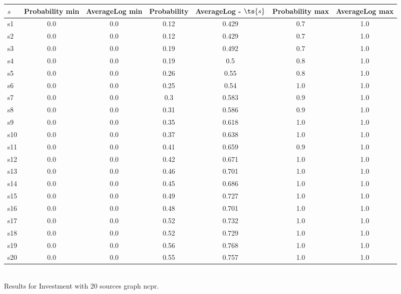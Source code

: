 \documentclass{article}
\begin{document}
\noindent\begin{tabular}{|l|c|c|c|c|c|c|}
\hline
$s$& Probability min & AverageLog min & Probability & AverageLog - $\ts{s}$ & Probability max & AverageLog max\\
\hline
s1 &0.0 & 0.0 & 0.12 & 0.429 & 0.7 & 1.0\\
\hline
s2 &0.0 & 0.0 & 0.12 & 0.429 & 0.7 & 1.0\\
\hline
s3 &0.0 & 0.0 & 0.19 & 0.492 & 0.7 & 1.0\\
\hline
s4 &0.0 & 0.0 & 0.19 & 0.5 & 0.8 & 1.0\\
\hline
s5 &0.0 & 0.0 & 0.26 & 0.55 & 0.8 & 1.0\\
\hline
s6 &0.0 & 0.0 & 0.25 & 0.54 & 1.0 & 1.0\\
\hline
s7 &0.0 & 0.0 & 0.3 & 0.583 & 0.9 & 1.0\\
\hline
s8 &0.0 & 0.0 & 0.31 & 0.586 & 0.9 & 1.0\\
\hline
s9 &0.0 & 0.0 & 0.35 & 0.618 & 1.0 & 1.0\\
\hline
s10 &0.0 & 0.0 & 0.37 & 0.638 & 1.0 & 1.0\\
\hline
s11 &0.0 & 0.0 & 0.41 & 0.659 & 0.9 & 1.0\\
\hline
s12 &0.0 & 0.0 & 0.42 & 0.671 & 1.0 & 1.0\\
\hline
s13 &0.0 & 0.0 & 0.46 & 0.701 & 1.0 & 1.0\\
\hline
s14 &0.0 & 0.0 & 0.45 & 0.686 & 1.0 & 1.0\\
\hline
s15 &0.0 & 0.0 & 0.49 & 0.727 & 1.0 & 1.0\\
\hline
s16 &0.0 & 0.0 & 0.48 & 0.701 & 1.0 & 1.0\\
\hline
s17 &0.0 & 0.0 & 0.52 & 0.732 & 1.0 & 1.0\\
\hline
s18 &0.0 & 0.0 & 0.52 & 0.729 & 1.0 & 1.0\\
\hline
s19 &0.0 & 0.0 & 0.56 & 0.768 & 1.0 & 1.0\\
\hline
s20 &0.0 & 0.0 & 0.55 & 0.757 & 1.0 & 1.0\\
\hline
\end{tabular}\\

\noindent Results for Investment with 20 sources graph ncpr.
\end{document}
